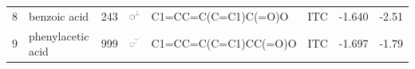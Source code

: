 \documentclass[aps,pre,twocolumn,nofootinbib,superscriptaddress,10pt, final,tightenlines]{revtex4-1}
\begin{document}
\begin{table}
\begin{tabular}{lllp{2cm}>{\ttfamily}llS[table-format=-1.3, table-figures-uncertainty=1]S[table-format=-1.2, table-figures-uncertainty=1]}
8    & benzoic acid                & 243      & \parbox[c]{1em}{\includegraphics[scale=0.2]{figures/243.pdf}}    & C1=CC=C(C=C1)C(=O)O     & ITC    & -1.640   & -2.51  \\
9    & phenylacetic acid           & 999      & \parbox[c]{1em}{\includegraphics[scale=0.2]{figures/999.pdf}}    & C1=CC=C(C=C1)CC(=O)O    & ITC    & -1.697   & -1.79  \\

\end{tabular}
\end{table}
\end{document}
